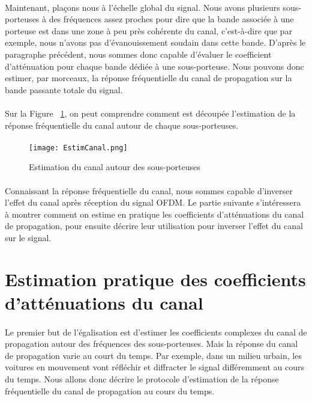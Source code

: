 \paragraph{}
Maintenant, plaçons nous à l'échelle global du signal. Nous avons plusieurs
sous-porteuses à des fréquences assez proches pour dire que la bande associée à
une porteuse est dans une zone à peu près cohérente du canal, c'est-à-dire que
par exemple, nous n'avons pas d'évanouissement soudain dans cette bande. D'après
le paragraphe précédent, nous sommes donc capable d'évaluer le coefficient
d'atténuation pour chaque bande dédiée à une sous-porteuse. Nous pouvons donc
estimer, par morceaux, la réponse fréquentielle du canal de propagation sur la
bande passante totale du signal.
\paragraph{}
Sur la Figure ~\ref{EstimPort}, on peut comprendre comment est découpée
l'estimation de la réponse fréquentielle du canal autour de chaque
sous-porteuses.

\paragraph{}
\vspace{1\baselineskip}
\begin{figure}[!h]
  \centering
  \texttt{[image: EstimCanal.png]}
  \caption{Estimation du canal autour des sous-porteuses }
	\label{EstimPort}
\end{figure}

\paragraph{}
Connaissant la réponse fréquentielle du canal, nous sommes capable d'inverser
l'effet du canal après réception du signal OFDM. Le partie suivante
s'intéressera à montrer comment on estime en pratique les coefficients
d'atténuations du canal de propagation, pour ensuite décrire leur
utilisation pour inverser l'effet du canal sur le signal.


\section{Estimation pratique des coefficients d'atténuations du canal}

\paragraph{}
Le premier but de l'égalisation est d'estimer les coefficients complexes du
canal de propagation autour des fréquences des sous-porteuses. Mais la réponse
du canal de propagation varie au court du temps. Par exemple, dans un milieu
urbain, les voitures en mouvement vont réfléchir et
diffracter le signal différemment au cours du temps. Nous allons donc décrire
le protocole d'estimation de la réponse fréquentielle du canal de propagation au
cours du temps.
